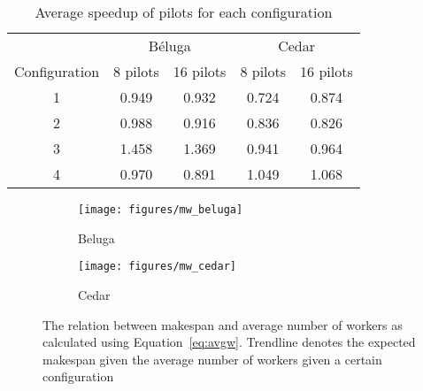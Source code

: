 \documentclass{IEEEtran}
\begin{document}
\begin{table}                                                                    
    \centering                                                                       
    \begin{tabular}{c|c|c|c|c}                                                             
        {} & \multicolumn{2}{c}{B\'eluga} & \multicolumn{2}{c}{Cedar}\\
    \rowcolor{headcolor}                                                             
    Configuration & 8 pilots & 16 pilots & 8 pilots & 16 pilots\\                               
    \hline                                                                           
    1 & 0.949 & 0.932 & 0.724 & 0.874\\                                               
    2 & 0.988 & 0.916 & 0.836 & 0.826\\                                               
    3 & 1.458 & 1.369 & 0.941 & 0.964\\
    4 & 0.970 & 0.891 & 1.049 & 1.068\\
    \end{tabular}                                                                    
    \setlength{\belowcaptionskip}{-10pt}                                             
    \caption{Average speedup of pilots for each configuration}                                                    
    \label{table:speedup}                                                            
\end{table} 



    \begin{figure*}
        \centering
        \begin{subfigure}[b]{0.475\textwidth}
            \centering
            \texttt{[image: figures/mw\_beluga]}
            \caption[]%
            {{\small Beluga}}
            \label{fig:mwbeluga}
        \end{subfigure}
        \hfill
        \begin{subfigure}[b]{0.475\textwidth}
            \centering
            \texttt{[image: figures/mw\_cedar]}
            \caption[]%
            {{\small Cedar}}
            \label{fig:mwcedar}
        \end{subfigure}
        \caption[]
        {\small The relation between makespan and average number of workers as 
        calculated using Equation~\ref{eq:avgw}. Trendline denotes the expected makespan
        given the average number of workers given a certain configuration}
        \label{fig:mwall}
    \end{figure*}
\end{document}
